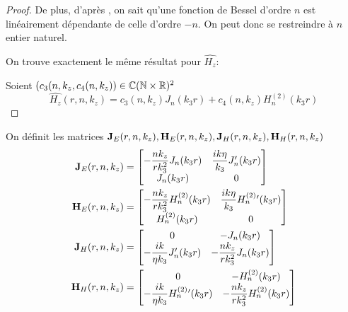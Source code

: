 \begin{proof}
    De plus, d'après \cite[p.~358]{abramowitz_handbook_1964}, on sait qu'une fonction de Bessel d'ordre \(n\) est linéairement dépendante de celle d'ordre \(-n\).
    On peut donc se restreindre à \(n\) entier naturel.

    On trouve exactement le même résultat pour \(\hat{H_z}\): 

    Soient \((c_3(n,k_z,c_4(n,k_z)) \in \mathbb C(\mathbb N\times\mathbb R)^2\)
    \begin{equation}
      \hat{H_z}(r,n,k_z) = c_3(n,k_z) J_n\left(k_3r\right) + c_4(n,k_z) H_n^{(2)}\left(k_3r\right)
    \end{equation}
  \end{proof}


  \begin{defn}
    On définit les matrices \(\mathbf{J}_{E}(r,n,k_z),\mathbf{H}_{E}(r,n,k_z),\mathbf{J}_{H}(r,n,k_z),\mathbf{H}_{H}(r,n,k_z)\)
    \begin{align}
      \mathbf{J}_{E}(r,n,k_z) &=
      \begin{bmatrix}
        -\dfrac{nk_z}{rk_3^2}J_n(k_3r) & \dfrac{ik\eta}{k_3}J_n'(k_3r)
        \\
        J_n(k_3r) & 0
      \end{bmatrix}
      \\
      \mathbf{H}_{E}(r,n,k_z) &=
      \begin{bmatrix}
        -\dfrac{nk_z}{rk_3^2}H_n^{(2)}(k_3r) & \dfrac{ik\eta}{k_3}H_n^{(2)}{}'(k_3r)
        \\
        H_n^{(2)}(k_3r) & 0
      \end{bmatrix}
      \\
      \mathbf{J}_{H}(r,n,k_z) &=
      \begin{bmatrix}
        0 & -J_n(k_3r)
        \\
        -\dfrac{ik}{\eta k_3}J_n'(k_3r) & -\dfrac{nk_z}{rk_3^2}J_n(k_3r)
      \end{bmatrix}
      \\
      \mathbf{H}_{H}(r,n,k_z) &=
      \begin{bmatrix}
        0 & -H_n^{(2)}(k_3r)
        \\
        -\dfrac{ik}{\eta k_3}H_n^{(2)}{}'(k_3r) & -\dfrac{nk_z}{rk_3^2}H_n^{(2)}(k_3r)
      \end{bmatrix}
    \end{align}
  \end{defn}

